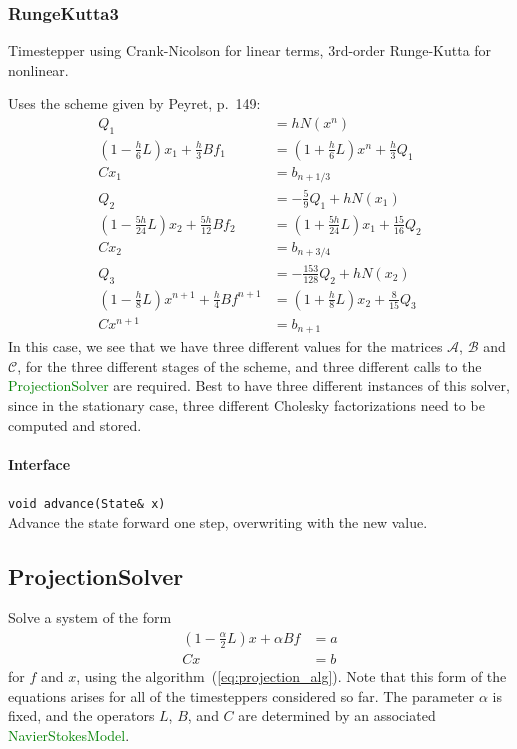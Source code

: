 \documentclass[11pt]{article}
\def\class#1{\textcolor{green}{\ttfamily\small #1}} %
\let\code\lstinline
\begin{document}
\subsubsection{RungeKutta3}
Timestepper using Crank-Nicolson for linear terms, 3rd-order Runge-Kutta for nonlinear.

Uses the scheme given by Peyret, p.~149\cite{Peyret:2002}:
\begin{align}
	Q_1 &= hN(x^n)\\
	(1-\frac{h}{6}L)x_1 + \frac{h}{3}Bf_1 &= (1+\frac{h}{6}L)x^n + \frac{h}{3}Q_1\\
	Cx_1 &= b_{n+1/3}\\
	Q_2 &= -\frac{5}{9} Q_1 + hN(x_1)\\
	(1-\frac{5h}{24}L)x_2 + \frac{5h}{12}Bf_2 &= (1+\frac{5h}{24}L)x_1 + \frac{15}{16}Q_2\\
	Cx_2 &= b_{n+3/4}\\
	Q_3 &= -\frac{153}{128} Q_2 + hN(x_2)\\
	(1-\frac{h}{8}L)x^{n+1} + \frac{h}{4}Bf^{n+1} &= (1+\frac{h}{8}L)x_2 + \frac{8}{15}Q_3\\
	Cx^{n+1} &= b_{n+1}
\end{align}
In this case, we see that we have three different values for the matrices $\mathcal{A}$, $\mathcal{B}$ and $\mathcal{C}$, for the three different stages of the scheme, and three different calls to the \class{ProjectionSolver} are required.  Best to have three different instances of this solver, since in the stationary case, three different Cholesky factorizations need to be computed and stored.

\paragraph{Interface}
\begin{description}
	\item \code|void advance(State& x)|\\
		Advance the state forward one step, overwriting with the new value.
\end{description}
		
\subsection{ProjectionSolver}
Solve a system of the form
\begin{equation}
\begin{aligned}
	(1 - \frac{\alpha}{2}L)x + \alpha Bf &= a\\
	Cx &= b
\end{aligned}
\label{eq:projection_specific}
\end{equation}
for $f$ and $x$, using the algorithm~(\ref{eq:projection_alg}).  Note that this form of the equations arises for all of the timesteppers considered so far.  The parameter $\alpha$ is fixed, and the operators $L$, $B$, and $C$ are determined by an associated \class{NavierStokesModel}.
\end{document}
